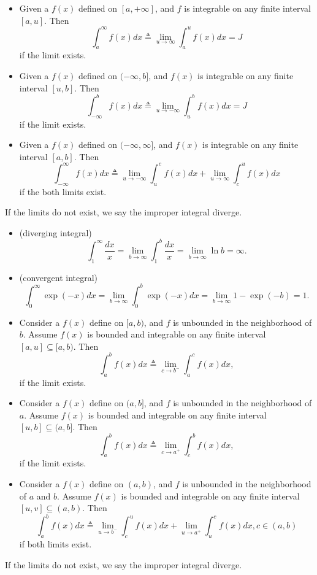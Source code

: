 \begin{refsection}
\begin{definition}\cite[580]{larson2009calculus}\hfill
	\begin{itemize}
		\item Given a $f(x)$ defined on $[a,+\infty]$, and $f$ is integrable on any finite interval $[a,u]$. Then
		$$\int_{a}^{\infty}f(x)dx \triangleq \lim_{u\to \infty}\int_a^u f(x)dx =J$$
		if the limit exists.
		\item Given a $f(x)$ defined on $(-\infty,b]$, and $f(x)$ is integrable on any finite interval $[u,b]$. Then
		$$\int_{-\infty}^{b}f(x)dx \triangleq \lim_{u\to -\infty}\int_u^b f(x)dx =J$$
		if the limit exists.
		\item Given a $f(x)$ defined on $(-\infty,\infty]$, and $f(x)$ is integrable on any finite interval $[a,b]$. Then
		$$\int_{-\infty}^{\infty}f(x)dx \triangleq \lim_{u\to -\infty}\int_u^c f(x)dx + \lim_{u\to \infty}\int_c^u f(x)dx$$
		if the both limits exist.
	\end{itemize}	
	If the limits do not exist, we say the improper integral diverge. 
\end{definition}

\begin{example}\cite[581]{larson2009calculus}\hfill
	\begin{itemize}
		\item (diverging integral)$$\int_1^\infty \frac{dx}{x} = \lim_{b\to \infty} \int_1^b \frac{dx}{x} = \lim_{b\to \infty}  \ln b = \infty.$$
		\item (convergent integral)
		$$\int_0^\infty \exp(-x)dx = \lim_{b\to \infty} \int_0^b \exp(-x)dx = \lim_{b\to \infty}  1 - \exp(-b) = 1.$$
	\end{itemize}	
\end{example}

\begin{definition}\cite[583]{larson2009calculus}\hfill
	\begin{itemize}
		\item Consider a $f(x)$ define on $[a,b)$, and $f$ is unbounded in the neighborhood of $b$. Assume $f(x)$ is bounded and integrable on any finite interval $[a,u] \subseteq [a,b)$. Then
		$$\int_{a}^{b}f(x)dx \triangleq \lim_{c\to b^-} \int_a^c f(x)dx,$$
		if the limit exists.
		\item Consider a $f(x)$ define on $(a,b]$, and $f$ is unbounded in the neighborhood of $a$. Assume $f(x)$ is bounded and integrable on any finite interval $[u,b] \subseteq (a,b]$. Then
		$$\int_{a}^{b}f(x)dx \triangleq \lim_{c\to a^+} \int_c^b f(x)dx,$$
		if the limit exists.
		\item Consider a $f(x)$ define on $(a,b)$, and $f$ is unbounded in the neighborhood of $a$ and $b$. Assume $f(x)$ is bounded and integrable on any finite interval $[u,v] \subseteq (a,b)$. Then
		$$\int_{a}^{b}f(x)dx \triangleq \lim_{u\to b^-} \int_c^u f(x)dx + \lim_{u\to a^+} \int_u^c f(x)dx, c\in (a,b)$$
		if both limits exist.
	\end{itemize}	
	If the limits do not exist, we say the improper integral diverge. 
\end{definition}


\end{refsection}
